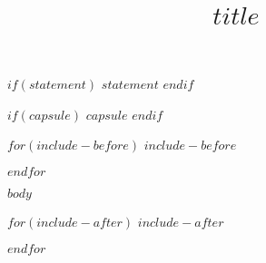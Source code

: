 \documentclass[$if(twocol)$twocol$endif$]{ametsocV6.1}
\title{$title$}
\affiliation{
$for(affiliations)$
\aff{$affiliations.aff$}{$affiliations.name$}\\
$endfor$
} %
\begin{document}
\maketitle


%
%
%
%

$if(statement)$
$statement$
$endif$ %

%

$if(capsule)$
$capsule$
$endif$

%

$for(include-before)$
$include-before$

$endfor$

%

$body$

$for(include-after)$
$include-after$

$endfor$
\end{document}
